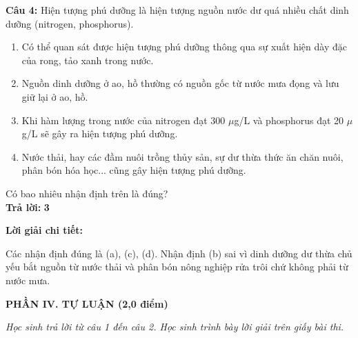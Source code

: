 \documentclass[10.5pt,a4paper]{article}
\newcommand{\loigiai}[1]{%
  \vspace{1pt}
  \begin{tcolorbox}
  {\color{myBlue}\bfseries Lời giải chi tiết:}\par\vspace{1pt}
  {\small #1}
  \end{tcolorbox}
  \vspace{2pt}
}
\begin{document}
\textbf{Câu 4:} Hiện tượng phú dưỡng là hiện tượng nguồn nước dư quá nhiều chất dinh dưỡng (nitrogen, phosphorus).
\begin{enumerate}[label=\alph*), itemsep=1pt, topsep=1pt, leftmargin=0.8cm]
    \item Có thể quan sát được hiện tượng phú dưỡng thông qua sự xuất hiện dày đặc của rong, tảo xanh trong nước.
    \item Nguồn dinh dưỡng ở ao, hồ thường có nguồn gốc từ nước mưa đọng và lưu giữ lại ở ao, hồ.
    \item Khi hàm lượng trong nước của nitrogen đạt 300 $\mu$g/L và phosphorus đạt 20 $\mu$g/L sẽ gây ra hiện tượng phú dưỡng.
    \item Nước thải, hay các đầm nuôi trồng thủy sản, sự dư thừa thức ăn chăn nuôi, phân bón hóa học... cũng gây hiện tượng phú dưỡng.
\end{enumerate}
Có bao nhiêu nhận định trên là đúng?\\
\textbf{Trả lời:} {\color{myRed}\textbf{3}}
\loigiai{Các nhận định đúng là (a), (c), (d). Nhận định (b) sai vì dinh dưỡng dư thừa chủ yếu bắt nguồn từ nước thải và phân bón nông nghiệp rửa trôi chứ không phải từ nước mưa.}

\vspace{6pt}
{\color{myGreen}\large\bfseries PHẦN IV. TỰ LUẬN (2,0 điểm)}

\textit{Học sinh trả lời từ câu 1 đến câu 2. Học sinh trình bày lời giải trên giấy bài thi.}
\end{document}
